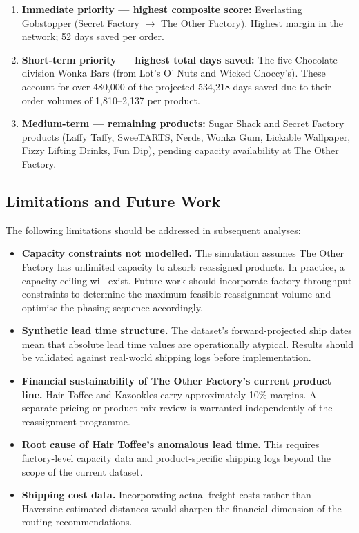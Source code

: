 \documentclass[12pt, a4paper]{article}
\begin{document}
\begin{enumerate}[leftmargin=*, label=\textbf{Phase \arabic*.}]
    \item \textbf{Immediate priority --- highest composite
          score:} Everlasting Gobstopper (Secret Factory
          $\rightarrow$ The Other Factory). Highest margin
          in the network; 52 days saved per order.
    \item \textbf{Short-term priority --- highest total days
          saved:} The five Chocolate division Wonka Bars
          (from Lot's O' Nuts and Wicked Choccy's). These
          account for over 480,000 of the projected 534,218
          days saved due to their order volumes of
          1,810--2,137 per product.
    \item \textbf{Medium-term --- remaining products:} Sugar
          Shack and Secret Factory products (Laffy Taffy,
          SweeTARTS, Nerds, Wonka Gum, Lickable Wallpaper,
          Fizzy Lifting Drinks, Fun Dip), pending capacity
          availability at The Other Factory.
\end{enumerate}

\subsection*{Limitations and Future Work}

The following limitations should be addressed in subsequent
analyses:

\begin{itemize}[leftmargin=*]
    \item \textbf{Capacity constraints not modelled.}
          The simulation assumes The Other Factory has
          unlimited capacity to absorb reassigned products.
          In practice, a capacity ceiling will exist.
          Future work should incorporate factory throughput
          constraints to determine the maximum feasible
          reassignment volume and optimise the phasing
          sequence accordingly.
    \item \textbf{Synthetic lead time structure.} The
          dataset's forward-projected ship dates mean that
          absolute lead time values are operationally
          atypical. Results should be validated against
          real-world shipping logs before implementation.
    \item \textbf{Financial sustainability of The Other
          Factory's current product line.} Hair Toffee and
          Kazookles carry approximately 10\% margins. A
          separate pricing or product-mix review is
          warranted independently of the reassignment
          programme.
    \item \textbf{Root cause of Hair Toffee's anomalous
          lead time.} This requires factory-level capacity
          data and product-specific shipping logs beyond
          the scope of the current dataset.
    \item \textbf{Shipping cost data.} Incorporating actual
          freight costs rather than Haversine-estimated
          distances would sharpen the financial dimension
          of the routing recommendations.
\end{itemize}
\end{document}
